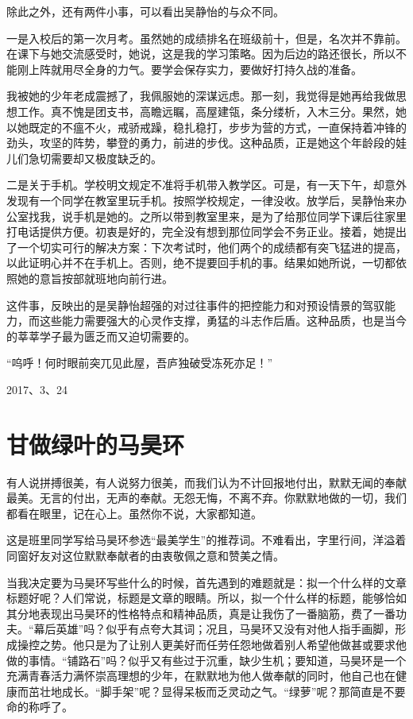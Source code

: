 \documentclass[openany]{ctexbook}
\begin{document}
除此之外，还有两件小事，可以看出吴静怡的与众不同。

一是入校后的第一次月考。虽然她的成绩排名在班级前十，但是，名次并不靠前。在课下与她交流感受时，她说，这是我的学习策略。因为后边的路还很长，所以不能刚上阵就用尽全身的力气。要学会保存实力，要做好打持久战的准备。

我被她的少年老成震撼了，我佩服她的深谋远虑。那一刻，我觉得是她再给我做思想工作。真不愧是团支书，高瞻远瞩，高屋建瓴，条分缕析，入木三分。果然，她以她既定的不瘟不火，戒骄戒躁，稳扎稳打，步步为营的方式，一直保持着冲锋的劲头，攻坚的阵势，攀登的勇力，前进的步伐。这种品质，正是她这个年龄段的娃儿们急切需要却又极度缺乏的。

二是关于手机。学校明文规定不准将手机带入教学区。可是，有一天下午，却意外发现有一个同学在教室里玩手机。按照学校规定，一律没收。放学后，吴静怡来办公室找我，说手机是她的。之所以带到教室里来，是为了给那位同学下课后往家里打电话提供方便。初衷是好的，完全没有想到那位同学会不务正业。接着，她提出了一个切实可行的解决方案：下次考试时，他们两个的成绩都有突飞猛进的提高，以此证明心并不在手机上。否则，绝不提要回手机的事。结果如她所说，一切都依照她的意旨按部就班地向前行进。

这件事，反映出的是吴静怡超强的对过往事件的把控能力和对预设情景的驾驭能力，而这些能力需要强大的心灵作支撑，勇猛的斗志作后盾。这种品质，也是当今的莘莘学子最为匮乏而又迫切需要的。

``呜呼！何时眼前突兀见此屋，吾庐独破受冻死亦足！''

2017、3、24

\chapter*{甘做绿叶的马昊环}\label{mahaohuan}

有人说拼搏很美，有人说努力很美，而我们认为不计回报地付出，默默无闻的奉献最美。无言的付出，无声的奉献。无怨无悔，不离不弃。你默默地做的一切，我们都看在眼里，记在心上。虽然你不说，大家都知道。

这是班里同学写给马昊环参选``最美学生''的推荐词。不难看出，字里行间，洋溢着同窗好友对这位默默奉献者的由衷敬佩之意和赞美之情。

当我决定要为马昊环写些什么的时候，首先遇到的难题就是：拟一个什么样的文章标题好呢？人们常说，标题是文章的眼睛。所以，拟一个什么样的标题，能够恰如其分地表现出马昊环的性格特点和精神品质，真是让我伤了一番脑筋，费了一番功夫。``幕后英雄''吗？似乎有点夸大其词；况且，马昊环又没有对他人指手画脚，形成操控之势。他只是为了让别人更美好而任劳任怨地做着别人希望他做甚或要求他做的事情。``铺路石''吗？似乎又有些过于沉重，缺少生机；要知道，马昊环是一个充满青春活力满怀崇高理想的少年，在默默地为他人做奉献的同时，他自己也在健康而茁壮地成长。``脚手架''呢？显得呆板而乏灵动之气。``绿萝''呢？那简直是不要命的称呼了。
\end{document}

